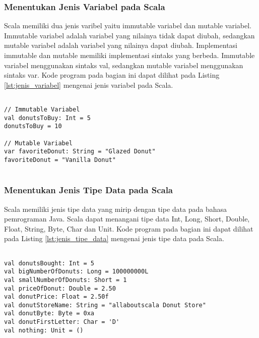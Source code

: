 \subsubsection{Menentukan Jenis Variabel pada Scala}
Scala memiliki dua jenis varibel yaitu immutable variabel dan mutable variabel. Immutable variabel adalah variabel yang nilainya tidak dapat diubah, sedangkan mutable variabel adalah variabel yang nilainya dapat diubah. Implementasi immutable dan mutable memiliki implementasi sintaks yang berbeda. Immutable variabel menggunakan sintaks val, sedangkan mutable variabel menggunakan sintaks var. Kode program pada bagian ini dapat dilihat pada Listing \ref{lst:jenis_variabel} mengenai jenis variabel pada Scala.

\begin{lstlisting}[basicstyle=\ttfamily, frame=single,
	columns=fullflexible, keepspaces=true, breaklines=true, label=lst:jenis_variabel, caption=Menentukan Jenis Variabel pada Scala]
	
// Immutable Variabel
val donutsToBuy: Int = 5
donutsToBuy = 10

// Mutable Variabel
var favoriteDonut: String = "Glazed Donut"
favoriteDonut = "Vanilla Donut"


\end{lstlisting}

\subsubsection{Menentukan Jenis Tipe Data pada Scala}
Scala memiliki jenis tipe data yang mirip dengan tipe data pada bahasa pemrograman Java. Scala dapat menangani tipe data Int, Long, Short, Double, Float, String, Byte, Char dan Unit. Kode program pada bagian ini dapat dilihat pada Listing \ref{lst:jenis_tipe_data} mengenai jenis tipe data pada Scala.

\begin{lstlisting}[basicstyle=\ttfamily, frame=single,
	columns=fullflexible, keepspaces=true, breaklines=true, label=lst:jenis_tipe_data, caption=Menentukan Jenis Tipe Data pada Scala]
	
val donutsBought: Int = 5
val bigNumberOfDonuts: Long = 100000000L
val smallNumberOfDonuts: Short = 1
val priceOfDonut: Double = 2.50
val donutPrice: Float = 2.50f
val donutStoreName: String = "allaboutscala Donut Store"
val donutByte: Byte = 0xa
val donutFirstLetter: Char = 'D'
val nothing: Unit = ()

\end{lstlisting}

